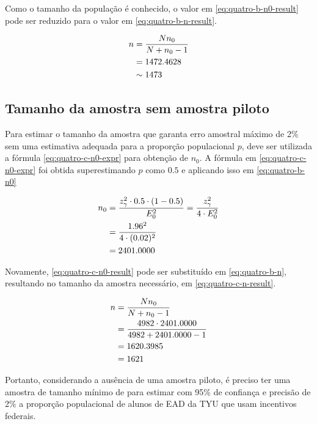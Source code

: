 	Como o tamanho da população é conhecido, o valor em
	\eqref{eq:quatro-b-n0-result} pode ser reduzido para o valor em
	\eqref{eq:quatro-b-n-result}.

	\begin{align}
		n &= \frac{N n_0}{N + n_0 - 1} \nonumber \\
		  &= 1472.4628 \nonumber \\
		  &\sim \label{eq:quatro-b-n-result} 1473
	\end{align}

\subsection{Tamanho da amostra sem amostra piloto}

	Para estimar o tamanho da amostra que garanta erro amostral máximo de
	2\% sem uma estimativa adequada para a proporção populacional $p$, deve
	ser utilizada a fórmula \eqref{eq:quatro-c-n0-expr} para obtenção de
	$n_0$. A fórmula em \eqref{eq:quatro-c-n0-expr} foi obtida
	superestimando $p$ como $0.5$ e aplicando isso em \eqref{eq:quatro-b-n0}

	\begin{align}
		n_0 &= \label{eq:quatro-c-n0-expr}
			   \frac{z_\gamma^2 \cdot 0.5 \cdot (1 - 0.5)}{E_0^2} = \frac{z_\gamma^2}{4 \cdot E_0^2} \\
			&= \frac{1.96^2}{4 \cdot (0.02)^2} \nonumber \\
			&= \label{eq:quatro-c-n0-result}
			   2401.0000
	\end{align}

	Novamente, \eqref{eq:quatro-c-n0-result} pode ser substituído em
	\eqref{eq:quatro-b-n}, resultando no tamanho da amostra necessário, em
	\eqref{eq:quatro-c-n-result}.

	\begin{align}
		n &= \frac{N n_0}{N + n_0 - 1} \nonumber \\
		  &= \frac{4982 \cdot 2401.0000}{4982 + 2401.0000 - 1} \nonumber \\
		  &= 1620.3985 \nonumber \\
		  &= \label{eq:quatro-c-n-result} 
			 1621
	\end{align}

	Portanto, considerando a ausência de uma amostra piloto, é preciso ter
	uma amostra de tamanho mínimo de \QUATROCnceil para estimar com 95\% de
	confiança e precisão de 2\% a proporção populacional de alunos de EAD da
	TYU que usam incentivos federais.
